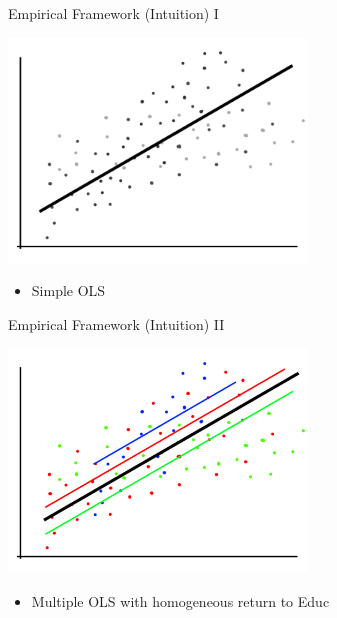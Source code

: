 \documentclass[10pt,ignorenonframetext,]{beamer}
\providecommand{\tightlist}{%
  \setlength{\itemsep}{0pt}\setlength{\parskip}{0pt}}
\begin{document}
\begin{frame}{Empirical Framework (Intuition) I}
\protect\hypertarget{empirical-framework-intuition-i}{}

\includegraphics[width=3.125in,height=\textheight]{img/rcmodel001.png}

\begin{itemize}
\tightlist
\item
  Simple OLS
\end{itemize}

\end{frame}

\begin{frame}{Empirical Framework (Intuition) II}
\protect\hypertarget{empirical-framework-intuition-ii}{}

\includegraphics[width=3.125in,height=\textheight]{img/rcmodel002.png}

\begin{itemize}
\tightlist
\item
  Multiple OLS with homogeneous return to Educ
\end{itemize}

\end{frame}
\end{document}
